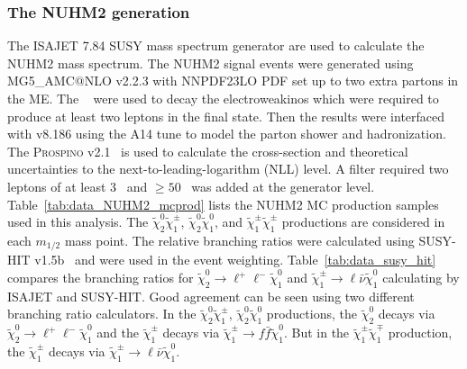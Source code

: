 \subsubsection{The NUHM2 generation}
\label{subsubsec:data_NUHM2_generation}
The \textsc{ISAJET} 7.84 SUSY mass spectrum generator are used to calculate the NUHM2 mass spectrum.
The NUHM2 signal events were generated using MG5\_{\scriptsize A}MC@NLO v2.2.3 with NNPDF23LO PDF set up to two extra partons in the ME.
The {\MADSPIN}~\cite{Artoisenet:2012st} were used to decay the electroweakinos which were required to produce at least two leptons in the final state.
Then the results were interfaced with {\PYTHIA} v8.186 using the A14 tune to model the parton shower and hadronization.
The \textsc{Prospino} v2.1~\cite{Beenakker:1996ed} is used to calculate the cross-section and theoretical uncertainties to the next-to-leading-logarithm (NLL) level.
A filter required two leptons of at least 3~{\GeV} and \met $\ge 50$~{\GeV} was added at the generator level.
Table~\ref{tab:data_NUHM2_mcprod} lists the NUHM2 MC production samples used in this analysis.
The $\widetilde{\chi}^{0}_{2} \widetilde{\chi}^{\pm}_{1}$, $\widetilde{\chi}^{0}_{2} \widetilde{\chi}^{0}_{1}$, and $\widetilde{\chi}^{\pm}_{1} \widetilde{\chi}^{\pm}_{1}$ productions are considered in each $m_{1/2}$ mass point.
The relative branching ratios were calculated using SUSY-HIT v1.5b~\cite{Djouadi:2006bz} and were used in the event weighting.
Table~\ref{tab:data_susy_hit} compares the branching ratios for $\widetilde{\chi}^{0}_{2} \to \ell^{+} \ell^{-} \widetilde{\chi}^{0}_{1}$ and $\widetilde{\chi}^{\pm}_{1} \to \ell \bar{\nu} \widetilde{\chi}^{0}_{1}$ calculating by \textsc{ISAJET} and SUSY-HIT.
Good agreement can be seen using two different branching ratio calculators.
In the $\widetilde{\chi}^{0}_{2} \widetilde{\chi}^{\pm}_{1}$, $\widetilde{\chi}^{0}_{2} \widetilde{\chi}^{0}_{1}$ productions, the $\widetilde{\chi}^{0}_{2}$ decays via $\widetilde{\chi}^{0}_{2} \to \ell^{+} \ell^{-} \widetilde{\chi}^{0}_{1}$ and the $\widetilde{\chi}^{\pm}_{1}$ decays via $\widetilde{\chi}^{\pm}_{1} \to f\bar{f} \widetilde{\chi}^{0}_{1}$.
But in the $\widetilde{\chi}^{\pm}_{1} \widetilde{\chi}^{\mp}_{1}$ production, the $\widetilde{\chi}^{\pm}_{1}$ decays via $\widetilde{\chi}^{\pm}_{1} \to \ell \bar{\nu} \widetilde{\chi}^{0}_{1}$.

